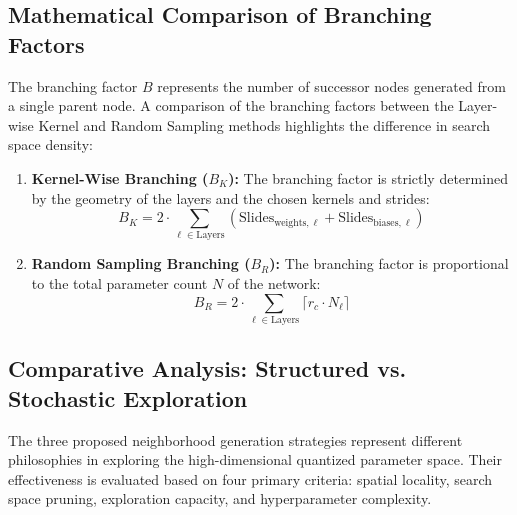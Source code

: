 \subsection{Mathematical Comparison of Branching Factors}
The branching factor $B$ represents the number of successor nodes generated from a single parent node. A comparison of the branching factors between the Layer-wise Kernel and Random Sampling methods highlights the difference in search space density:

\begin{enumerate}
    \item \textbf{Kernel-Wise Branching ($B_K$):} The branching factor is strictly determined by the geometry of the layers and the chosen kernels and strides:
    $$ B_K = 2 \cdot \sum_{\ell \in \text{Layers}} \left( \text{Slides}_{\text{weights}, \ell} + \text{Slides}_{\text{biases}, \ell} \right) $$
    
    \item \textbf{Random Sampling Branching ($B_R$):} The branching factor is proportional to the total parameter count $N$ of the network:
    $$ B_R = 2 \cdot \sum_{\ell \in \text{Layers}} \lceil r_c \cdot N_{\ell} \rceil $$
\end{enumerate}

\subsection{Comparative Analysis: Structured vs. Stochastic Exploration}

The three proposed neighborhood generation strategies represent different philosophies in exploring the high-dimensional quantized parameter space. Their effectiveness is evaluated based on four primary criteria: spatial locality, search space pruning, exploration capacity, and hyperparameter complexity.

